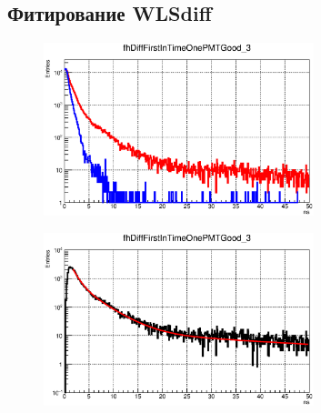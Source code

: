 \subsection{Фитирование WLS\textunderscore diff}

\begin{figure}[H]
\includegraphics[width=0.7\textwidth]{pictures/WLS_curves.eps}
\caption{}
\label{fig:WlsCurves}
\end{figure}

\begin{figure}[H]
\includegraphics[width=0.7\textwidth]{pictures/diff_tripleTauFit_code682_1_1ns.eps}
\caption{}
\label{fig:WlsDiff}
\end{figure}